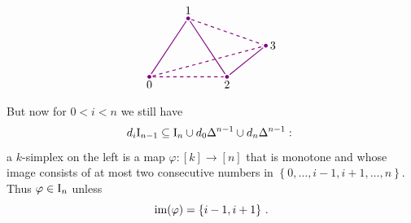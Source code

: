                 \begin{equation*}
            \begin{tikzpicture}[
                scale=1.2, 
                thick, 
                color=violet, %
                every node/.style={text=black},
                dot/.style={circle, fill=violet, inner sep=1.2pt, outer sep=0pt},
                edge/.style={shorten <=3pt, shorten >=3pt}
            ]

                \coordinate (v0) at (0,0);
                \coordinate (v1) at (1,1.5);
                \coordinate (v2) at (2,0);
                \coordinate (v3) at (3,0.8);

                \draw[dashed, edge] (v0) -- (v2);
                \draw[dashed, edge] (v0) -- (v3);
                \draw[dashed, edge] (v1) -- (v3);

                \draw[edge] (v0) -- (v1);
                \draw[edge] (v1) -- (v2);
                \draw[edge] (v2) -- (v3);

                \node[dot] at (v0) {};
                \node[dot] at (v1) {};
                \node[dot] at (v2) {};
                \node[dot] at (v3) {};

                \node[below] at (v0) {0};
                \node[above] at (v1) {1};
                \node[below] at (v2) {2};
                \node[right] at (v3) {3};

            \end{tikzpicture}
        \end{equation*}
        But now for $0 < i < n$ we still have
        \begin{equation*}
            d_i \mathrm{I}_{n-1} \subseteq \mathrm{I}_n \cup d_0 \Delta^{n-1} \cup d_n \Delta^{n-1} \,\colon
        \end{equation*}
        a $k$-simplex on the left is a map $\varphi \colon [k] \to [n]$ that is monotone and whose image consists of at most two consecutive numbers in $\left\{ 0, \dots, i - 1, i + 1, \ldots, n \right\}$. Thus $\varphi \in \mathrm{I}_n$ unless
        \begin{equation*}
            \operatorname{im}(\varphi) = \left\{ i - 1, i + 1 \right\} \,.
        \end{equation*}
